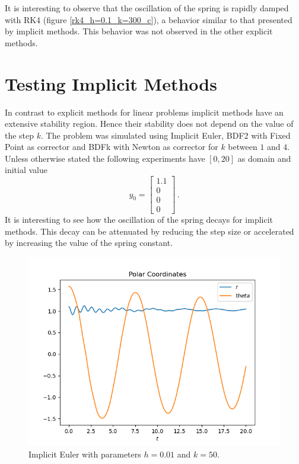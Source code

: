 \documentclass{report}
\newcommand{\vect}[1]{\begin{bmatrix} #1 \end{bmatrix}}
\newcounter{constant}
\begin{document}
It is interesting to observe that the oscillation of the spring is rapidly damped with RK4 (figure \ref{rk4_h=0.1_k=300_c}), a behavior similar to that presented by implicit methods.
This behavior was not observed in the other explicit methods.


\section*{Testing Implicit Methods}

In contrast to explicit methods for linear problems implicit methods have an extensive stability region. Hence their stability does not depend on the value of the step $k$.
The problem was simulated using Implicit Euler, BDF2 with Fixed Point as corrector and BDFk with Newton as corrector for $k$ between $1$ and $4$. Unless otherwise stated the following experiments have $[0,20]$ as domain and initial value $$y_0 = \vect{1.1 \\ 0 \\ 0 \\ 0}\,.$$
It is interesting to see how the oscillation of the spring decays for implicit methods. This decay can be attenuated by reducing the step size or accelerated by increasing the value of the spring constant.

\begin{figure}[h]
\centering
\begin{minipage}[b]{0.45\textwidth}
\centering
\includegraphics[width=\textwidth]{../Plots/ImpEuler/imp_euler_h=0.01_k=50_c}
\caption{Implicit Euler with parameters $h=0.01$ and $k=50$.}
\label{imp_euler_h=0.01_k=50_c}
\end{minipage}
\end{figure}
\end{document}
